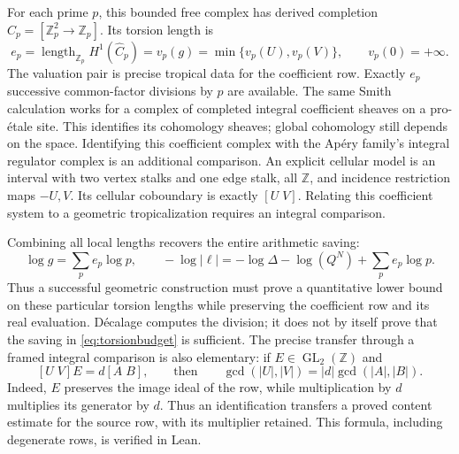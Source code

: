 \documentclass[11pt]{article}
\newcommand{\Z}{\mathbb Z}
\begin{document}
For each prime $p$, this bounded free complex has derived completion
$\widehat C_p=[\Z_p^2\to\Z_p]$. Its torsion length is
\begin{equation}
 e_p=\operatorname{length}_{\Z_p}H^1(\widehat C_p)
     =v_p(g)=\min\{v_p(U),v_p(V)\},\qquad v_p(0)=+\infty.
 \label{eq:torsion}
\end{equation}
The valuation pair is precise tropical data for the coefficient row.
Exactly $e_p$ successive common-factor divisions by $p$ are available.
The same Smith calculation works for a complex of completed integral
coefficient sheaves on a pro-\'etale site. This identifies its cohomology
sheaves; global cohomology still depends on the space.
Identifying this coefficient complex with the Ap\'ery family's integral
regulator complex is an additional comparison.
An explicit cellular model is an interval with two vertex stalks and one
edge stalk, all $\Z$, and incidence restriction maps $-U,V$.
Its cellular coboundary is exactly $[U\;V]$. Relating this coefficient
system to a geometric tropicalization requires an integral comparison.

Combining all local lengths recovers the entire arithmetic saving:
\begin{equation}
 \log g=\sum_p e_p\log p,\qquad
 -\log|\ell|=-\log\Delta-\log(Q^N)+\sum_p e_p\log p.
 \label{eq:torsionbudget}
\end{equation}
Thus a successful geometric construction must prove a quantitative lower
bound on these particular torsion lengths while preserving the coefficient
row and its real evaluation. D\'ecalage computes the division; it does not
by itself prove that the saving in \eqref{eq:torsionbudget} is sufficient.
The precise transfer through a framed integral comparison is also elementary:
if $E\in\operatorname{GL}_2(\Z)$ and
\[
 [U\;V]E=d[A\;B],
 \qquad\text{then}\qquad
 \gcd(|U|,|V|)=|d|\gcd(|A|,|B|).
\]
Indeed, $E$ preserves the image ideal of the row, while multiplication by
$d$ multiplies its generator by $d$. Thus an identification transfers a
proved content estimate for the source row, with its multiplier retained.
This formula, including degenerate rows, is verified in Lean.
\end{document}
